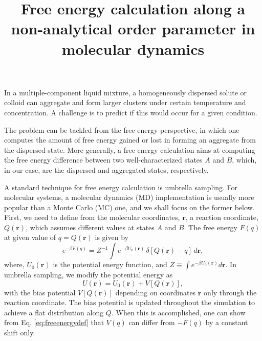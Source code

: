 \documentclass[notitlepage, preprint,superscriptaddress]{revtex4-1}
\newcommand{\vct}[1]{\mathbf{#1}}
\begin{document}
\title{Free energy calculation along a non-analytical order parameter in molecular dynamics}
\maketitle



%
In a multiple-component liquid mixture,
a homogeneously dispersed solute or colloid
can aggregate and form larger clusters
under certain temperature and concentration.
%
A challenge is to predict if this would occur
for a given condition.



%
The problem can be tackled
from the free energy perspective,
%
in which one computes
the amount of free energy gained or lost
in forming an aggregate from the dispersed state.
%
More generally,
a free energy calculation
aims at computing the free energy difference
between two well-characterized states $A$ and $B$,
which, in our case,
are the dispersed and aggregated states, respectively.


%
A standard technique for free energy calculation is
umbrella sampling.
%
For molecular systems,
a molecular dynamics (MD) implementation
is usually more popular than
a Monte Carlo (MC) one,
and we shall focus on the former below.
%
First,
we need to define
from the molecular coordinates, $\vct r$,
a reaction coordinate, $Q(\vct r)$,
which assumes different values
at states $A$ and $B$.
%
The free energy $F(q)$
at given value of $q = Q(\vct{r})$
is given by
%
\begin{equation}
e^{-\beta F(q)}
=
Z^{-1}
\int
  e^{-\beta U_0(\vct{r})} \,
  \delta[Q(\vct{r}) - q] \,
  d\vct{r},
\label{eq:freeenergydef}
\end{equation}
%
where,
$U_0(\vct{r})$
is the potential energy function,
and
$Z \equiv \int e^{-\beta U_0(\vct{r})} d\vct{r}$.
%
In umbrella sampling,
we modify the potential energy as
%
\begin{equation}
U(\vct{r})
=
U_0(\vct{r})
+
V[Q(\vct{r})],
\end{equation}
%
with the bias potential
$V[Q(\vct{r})]$
depending on coordinates $\vct{r}$
only through the reaction coordinate.
%
The bias potential
is updated throughout the simulation
to achieve a flat distribution along $Q$.
%
When this is accomplished,
one can show from Eq. \eqref{eq:freeenergydef}
that $V(q)$ can differ from $-F(q)$
by a constant shift only.
\end{document}
